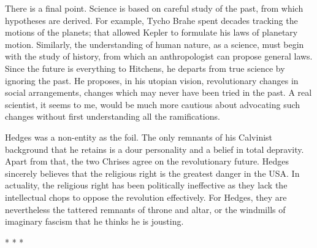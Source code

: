 There is a final point. Science is based on careful study of the past, from which hypotheses are derived. For example, Tycho Brahe spent decades tracking the motions of the planets; that allowed Kepler to formulate his laws of planetary motion. Similarly, the understanding of human nature, as a science, must begin with the study of history, from which an anthropologist can propose general laws. Since the future is everything to Hitchens, he departs from true science by ignoring the past. He proposes, in his utopian vision, revolutionary changes in social arrangements, changes which may never have been tried in the past. A real scientist, it seems to me, would be much more cautious about advocating such changes without first understanding all the ramifications.

Hedges was a non-entity as the foil. The only remnants of his Calvinist background that he retains is a dour personality and a belief in total depravity. Apart from that, the two Chrises agree on the revolutionary future. Hedges sincerely believes that the religious right is the greatest danger in the USA. In actuality, the religious right has been politically ineffective as they lack the intellectual chops to oppose the revolution effectively. For Hedges, they are nevertheless the tattered remnants of throne and altar, or the windmills of imaginary fascism that he thinks he is jousting.




\begin{center}* * *\end{center}

